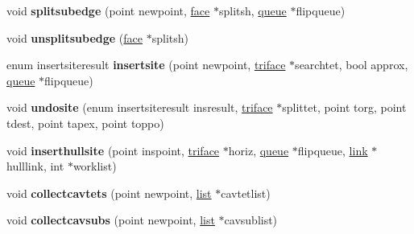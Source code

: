 \begin{DoxyCompactItemize}
\item 
\mbox{\label{classStemMesh3D_1_1tetgenmesh_ad019d35c8b9d1265a136631bd903ee16}} 
void {\bfseries splitsubedge} (point newpoint, \hyperlink{classStemMesh3D_1_1tetgenmesh_1_1face}{face} $\ast$splitsh, \hyperlink{classStemMesh3D_1_1tetgenmesh_1_1queue}{queue} $\ast$flipqueue)
\item 
\mbox{\label{classStemMesh3D_1_1tetgenmesh_ae3864c58c2f5a7e657eec408b364c4ac}} 
void {\bfseries unsplitsubedge} (\hyperlink{classStemMesh3D_1_1tetgenmesh_1_1face}{face} $\ast$splitsh)
\item 
\mbox{\label{classStemMesh3D_1_1tetgenmesh_a9877bb8bca9ae9f4325ca038cc714869}} 
enum insertsiteresult {\bfseries insertsite} (point newpoint, \hyperlink{classStemMesh3D_1_1tetgenmesh_1_1triface}{triface} $\ast$searchtet, bool approx, \hyperlink{classStemMesh3D_1_1tetgenmesh_1_1queue}{queue} $\ast$flipqueue)
\item 
\mbox{\label{classStemMesh3D_1_1tetgenmesh_a51b0fe379f621824124304f2593fbb69}} 
void {\bfseries undosite} (enum insertsiteresult insresult, \hyperlink{classStemMesh3D_1_1tetgenmesh_1_1triface}{triface} $\ast$splittet, point torg, point tdest, point tapex, point toppo)
\item 
\mbox{\label{classStemMesh3D_1_1tetgenmesh_af2051f6e97644410fb01c690f7277532}} 
void {\bfseries inserthullsite} (point inspoint, \hyperlink{classStemMesh3D_1_1tetgenmesh_1_1triface}{triface} $\ast$horiz, \hyperlink{classStemMesh3D_1_1tetgenmesh_1_1queue}{queue} $\ast$flipqueue, \hyperlink{classStemMesh3D_1_1tetgenmesh_1_1link}{link} $\ast$hulllink, int $\ast$worklist)
\item 
\mbox{\label{classStemMesh3D_1_1tetgenmesh_a02ee8b0bf1851f5e7256898461b0cd22}} 
void {\bfseries collectcavtets} (point newpoint, \hyperlink{classStemMesh3D_1_1tetgenmesh_1_1list}{list} $\ast$cavtetlist)
\item 
\mbox{\label{classStemMesh3D_1_1tetgenmesh_aace1af24c564174e5b0075bb56d40628}} 
void {\bfseries collectcavsubs} (point newpoint, \hyperlink{classStemMesh3D_1_1tetgenmesh_1_1list}{list} $\ast$cavsublist)

\end{DoxyCompactItemize}

